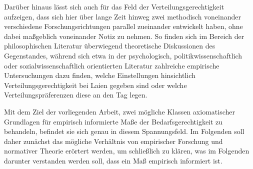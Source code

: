\documentclass[a4paper]{thesis}
\begin{document}
Darüber hinaus lässt sich auch für das Feld der Verteilungsgerechtigkeit aufzeigen, dass sich hier über lange Zeit hinweg zwei methodisch voneinander verschiedene Forschungsrichtungen parallel zueinander entwickelt haben, ohne dabei maßgeblich voneinander Notiz zu nehmen. So finden sich im Bereich der philosophischen Literatur überwiegend theoretische Diskussionen des Gegenstandes, während sich etwa in der psychologisch, politikwissenschaftlich oder sozialwissenschaftlich orientierten Literatur zahlreiche empirische Untersuchungen dazu finden, welche Einstellungen hinsichtlich Verteilungsgerechtigkeit bei Laien gegeben sind oder welche Verteilungspräferenzen diese an den Tag legen.

Mit dem Ziel der vorliegenden Arbeit, zwei mögliche Klassen axiomatischer Grundlagen für empirisch informierte Maße der Bedarfsgerechtigkeit zu behandeln, befindet sie sich genau in diesem Spannungsfeld. Im Folgenden soll daher zunächst das mögliche Verhältnis von empirischer Forschung und normativer Theorie erörtert werden, um schließlich zu klären, was im Folgenden darunter verstanden werden soll, dass ein Maß empirisch informiert ist.
\end{document}
